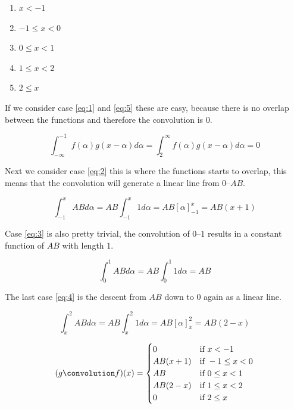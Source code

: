 \documentclass[a4paper, 10pt, final]{article}
\begin{document}
\begin{enumerate}

\item \label{eq:1} $x < -1$
\item \label{eq:2} $-1 \leq x < 0$
\item \label{eq:3} $0 \leq x < 1$
\item \label{eq:4} $1 \leq x < 2$
\item \label{eq:5} $2 \leq x$

\end{enumerate}

If we consider case \ref{eq:1} and \ref{eq:5} these are easy, because there is no overlap between the functions and therefore the convolution is $0$.

\begin{equation*}
  \int_{-\infty}^{-1} {f(\alpha)g(x - \alpha)} d\alpha = \int_{2}^{\infty} {f(\alpha)g(x - \alpha)} d\alpha = 0
\end{equation*}

Next we consider case \ref{eq:2} this is where the functions starts to
overlap, this means that the convolution will generate a linear line from $0$--$AB$.

\begin{equation*}
  \int_{-1}^{x} AB d\alpha = AB \int_{-1}^{x} 1 d\alpha = AB[\alpha]_{-1}^{x} =AB(x + 1)
\end{equation*}

Case \ref{eq:3} is also pretty trivial, the convolution of $0$--$1$ results in a constant function of $AB$ with length $1$.

\begin{equation*}
  \int_{0}^{1} AB d\alpha = AB \int_{0}^{1} 1 d\alpha = AB
\end{equation*}

The last case \ref{eq:4} is the descent from $AB$ down to $0$ again as a linear line.

\begin{equation*}
  \int_{x}^{2} AB d\alpha = AB \int_{x}^{2} 1 d\alpha = AB[\alpha]_{x}^{2} = AB(2 - x)
\end{equation*}

\begin{equation*}
  (g \convolution f)(x) = \begin{cases}
    0 & \textrm{if } x < -1 \\
    AB(x+1) & \textrm{if } -1 \leq x < 0 \\
    AB & \textrm{if } 0 \leq x < 1 \\
    AB(2-x) & \textrm{if } 1 \leq x < 2 \\
    0 & \textrm{if } 2 \leq x
    \end{cases}
\end{equation*}
\end{document}
